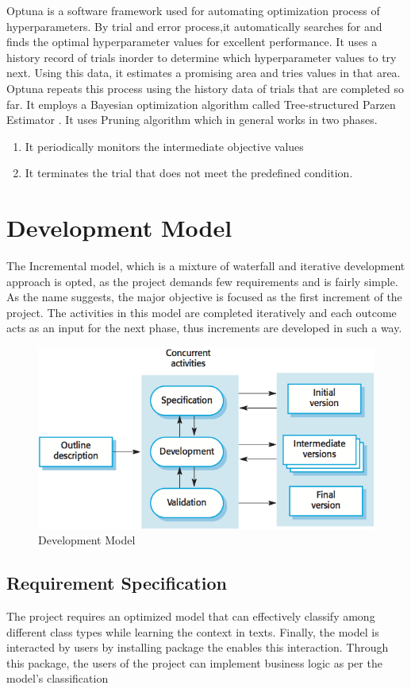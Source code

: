Optuna \cite{optuna_2019} is a software framework used for automating optimization process of hyperparameters. By trial and error process,it automatically searches for and finds the optimal hyperparameter values for excellent performance.
It uses a history record of trials inorder to determine which hyperparameter values to try next. Using this data, it estimates a promising area and tries values in that area. Optuna repeats this process using the history data of trials that are completed so far. It employs a Bayesian optimization algorithm called Tree-structured Parzen Estimator \cite{tree_structured}.
It uses Pruning algorithm which in general works in two phases.
\begin{enumerate}
\item It periodically monitors the intermediate objective values
\item It terminates the trial that does not meet the predefined condition.
\end{enumerate}


\section{Development Model}
The Incremental model, which is a mixture of waterfall and iterative development approach is opted, as the project demands few requirements and is fairly simple. As the name suggests, the major objective is focused as the first increment of the project. The activities in this model are completed iteratively and each outcome acts as an input for the next phase, thus increments are developed in such a way.
\begin{figure}[h]
	\centering
	\includegraphics[scale=1.3]{incremental.png}
	\caption{Development Model}
\end{figure}
\subsection{Requirement Specification}
The project requires an optimized model that can effectively classify among different class types while learning the context in texts. Finally, the model is interacted by users by installing package the enables this interaction. Through this package, the users of the project can implement business logic as per the model's classification

